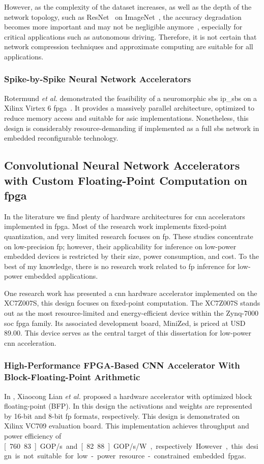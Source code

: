 However, as the complexity of the dataset increases, as well as the depth of the network topology, such as ResNet~\cite{he2016deep} on ImageNet~\cite{russakovsky2015imagenet}, the accuracy degradation becomes more important and may not be negligible anymore~\cite{rastegari2016xnor}, especially for critical applications such as autonomous driving. Therefore, it is not certain that network compression techniques and approximate computing are suitable for all applications.

\subsubsection{Spike-by-Spike Neural Network Accelerators}
Rotermund \textit{et al.} demonstrated the feasibility of a neuromorphic \gls{sbs} \gls{ip_sbs} on a Xilinx Virtex 6 \gls{fpga}~\cite{rotermund2018massively}. It provides a massively parallel architecture, optimized to reduce memory access and suitable for \gls{asic} implementations. Nonetheless, this design is considerably resource-demanding if implemented as a full \gls{sbs} network in embedded reconfigurable technology.

\subsection{Convolutional Neural Network Accelerators with Custom Floating-Point Computation on \gls{fpga}
}
\label{sec:related_work}
In the literature we find plenty of hardware architectures for \gls{cnn} accelerators implemented in \gls{fpga}. Most of the research work implements fixed-point quantization, and very limited research focuses on \gls{fp}. These studies concentrate on low-precision \gls{fp}; however, their applicability for inference on low-power embedded devices is restricted by their size, power consumption, and cost. To the best of my knowledge, there is no research work related to \gls{fp} inference for low-power embedded applications.

One research work has presented a \gls{cnn} hardware accelerator implemented on the XC7Z007S, this design focuses on fixed-point computation. The XC7Z007S stands out as the most resource-limited and energy-efficient device within the Zynq-7000 \gls{soc} \gls{fpga} family. Its associated development board, MiniZed, is priced at USD 89.00. This device serves as the central target of this dissertation for low-power \gls{cnn} acceleration.


\subsubsection{High-Performance FPGA-Based CNN Accelerator With Block-Floating-Point Arithmetic}
In \cite{lian2019high}, Xiaocong Lian \textit{et al.} proposed a hardware accelerator with optimized block floating-point (BFP). In this design the activations and weights are represented by 16-bit and 8-bit \gls{fp} formats, respectively. This design is demonstrated on Xilinx VC709 evaluation board. This implementation achieves throughput and power efficiency of \unit[760.83]{GOP/s} and \unit[82.88]{GOP/s/W}, respectively. However, this design is not suitable for low-power resource-constrained embedded \glspl{fpga}.

